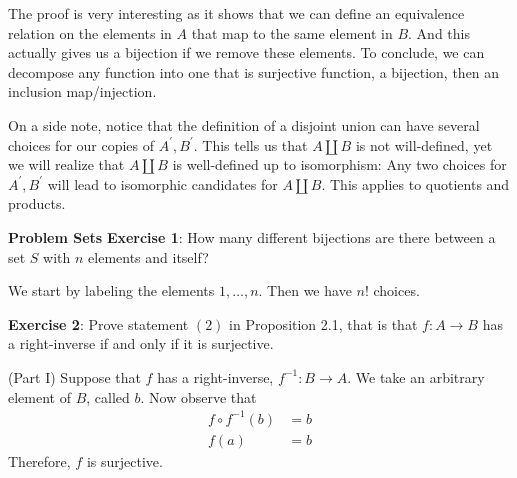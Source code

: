 \documentclass{report}
\begin{document}
The proof is very interesting as it shows that we can define an equivalence relation on the elements in $A$ that map to the same element in $B$. And this actually gives us a bijection if we remove these elements. To conclude, we can decompose any function into one that is surjective function, a bijection, then an inclusion map/injection.

On a side note, notice that the definition of a disjoint union can have several choices for our copies of $A^{\prime}, B^{\prime}$. This tells us that $A \coprod B$ is not will-defined, yet we will realize that $A \coprod B$ is well-defined up to isomorphism: Any two choices for $A^{\prime}, B^{\prime}$ will lead to isomorphic candidates for $A \coprod B$. This applies to quotients and products.

\begin{exercises}{\textbf{Problem Sets}}
    \textbf{Exercise 1}: How many different bijections are there between a set $S$ with $n$ elements and itself?

    \begin{answer}
        We start by labeling the elements $1, \ldots, n$. Then we have $n!$ choices.
    \end{answer}

    \textbf{Exercise 2}: Prove statement $(2)$ in Proposition 2.1, that is that $f : A \rightarrow B$ has a right-inverse if and only if it is surjective. 
    
    \begin{answer}
        (Part I) Suppose that $f$ has a right-inverse, $f^{-1} : B \rightarrow A$. We take an arbitrary element of $B$, called $b$. Now observe that
            \begin{align*}
                f \circ f^{-1} (b) &= b \\
                f (a) &= b
            \end{align*}
        Therefore, $f$ is surjective.


\end{answer}
\end{exercises}
\end{document}

